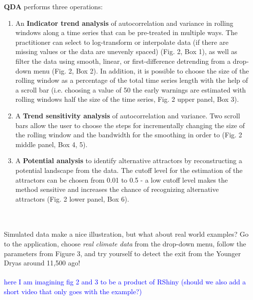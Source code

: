 \documentclass[12pt,a4paper,final]{article}
\begin{document}
\textbf{QDA} performs three operations:
\begin{enumerate}
\item An \textbf{Indicator trend analysis} of autocorrelation and variance in rolling windows along a time series that can be pre-treated in multiple ways. The practitioner can select to log-transform or interpolate data (if there are missing values or the data are unevenly spaced) (Fig. 2, Box 1), as well as filter the data using smooth, linear, or first-difference detrending from a drop-down menu (Fig. 2, Box 2). In addition, it is possible to choose the size of the rolling window as a percentage of the total time series length with the help of a scroll bar (i.e. choosing a value of 50 the early warnings are estimated with rolling windows half the size of the time series, Fig. 2 upper panel, Box 3).
\item A  \textbf{Trend sensitivity analysis} of autocorrelation and variance. Two scroll bars allow the user to choose the steps for incrementally changing the size of the rolling window and the bandwidth for the smoothing in order to (Fig. 2 middle panel, Box 4, 5). 
\item A \textbf{Potential analysis} to identify alternative attractors by reconstructing a potential landscape from the data. The cutoff level for the estimation of the attractors can be chosen from 0.01 to 0.5 - a low cutoff level makes the method sensitive and increases the chance of recognizing alternative attractors (Fig. 2 lower panel, Box 6).
\end{enumerate}
\\
\\
Simulated data make a nice illustration, but what about real world examples? Go to the application, choose \textit{real climate data} from the drop-down menu, follow the parameters from Figure 3, and try yourself to detect the exit from the Younger Dryas around 11,500 ago! 
\\
\\
\textcolor{blue}{here I am imagining fig 2 and 3 to be a product of RShiny (should we also add a short video that only goes with the example?)}
\end{document}
